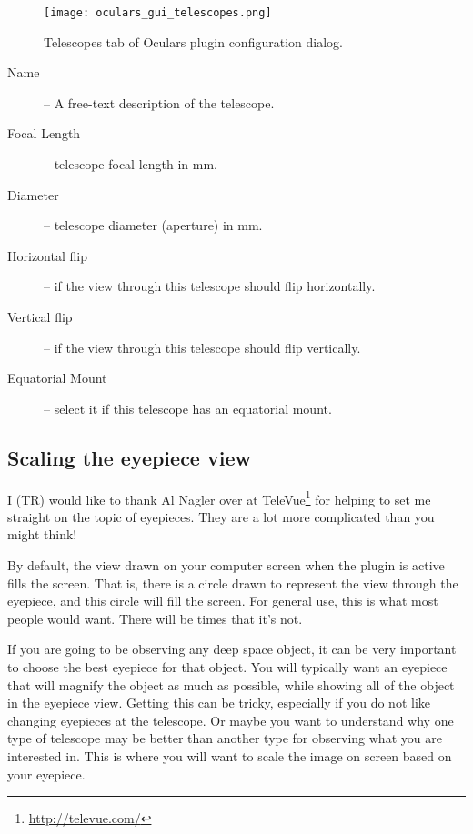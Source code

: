 \begin{figure}[ht]\centering
\texttt{[image: oculars\_gui\_telescopes.png]}
\caption{Telescopes tab of Oculars plugin configuration dialog.}
\label{fig:plugins:Oculars:Gui:Telescopes}
\end{figure}


\begin{description}
\item[Name] -- A free-text description of the telescope. 
\item[Focal Length] -- telescope focal length in mm.
\item[Diameter] -- telescope diameter (aperture) in mm.
\item[Horizontal flip] -- if the view through this telescope should flip horizontally.
\item[Vertical flip] -- if the view through this telescope should flip vertically.
\item[Equatorial Mount] -- select it if this telescope has an equatorial mount.
\end{description}

\subsection{Scaling the eyepiece view}
\label{sec:sec:plugins:Oculars:ScalingTheEyepieceView}
I (TR) would like to thank Al Nagler over at TeleVue\footnote{\url{http://televue.com/}} for helping to set me straight on the topic of eyepieces. They are a lot more complicated than you might think!

By default, the view drawn on your computer screen when the plugin is active fills the screen. That is, there is a circle drawn to represent the view through the eyepiece, and this circle will fill the screen. For general use, this is what most people would want. There will be times that it's not.

If you are going to be observing any deep space object, it can be very important to choose the best eyepiece for that object. You will typically want an eyepiece that will magnify the object as much as possible, while showing all of the object in the eyepiece view. Getting this can be tricky, especially if you do not like changing eyepieces at the telescope. Or maybe you want to understand why one type of telescope may be better than another type for observing what you are interested in. This is where you will want to scale the image on screen based on your eyepiece.

